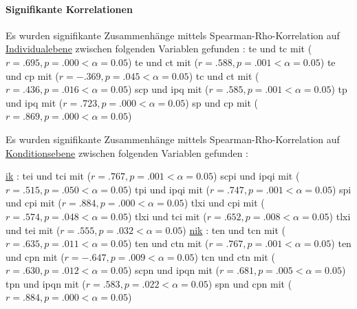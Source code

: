 \documentclass[a4paper,11pt]{article}%
\renewcommand{\\}{\vspace*{0.5\baselineskip} \newline}
\begin{document}
\paragraph{Signifikante Korrelationen}
Es wurden signifikante Zusammenhänge mittels Spearman-Rho-Korrelation auf \underline{Individualebene} zwischen folgenden Variablen gefunden :\newline
\acs{te} und \acs{tc} mit ($r = .695, p = .000 < \alpha = 0.05$)\newline
\acs{te} und \acs{ct} mit ($r = .588, p = .001 < \alpha = 0.05$)\newline
\acs{te} und \acs{cp} mit ($r = -.369, p = .045 < \alpha = 0.05$)\newline
\acs{tc} und \acs{ct} mit ($r = .436, p = .016 < \alpha = 0.05$)\newline
\acs{scp} und \acs{ipq} mit ($r = .585, p = .001 < \alpha = 0.05$)\newline
\acs{tp} und \acs{ipq} mit ($r = .723, p = .000 < \alpha = 0.05$)\newline
\acs{sp} und \acs{cp} mit ($r = .869, p = .000 < \alpha = 0.05$)\newline

Es wurden signifikante Zusammenhänge mittels Spearman-Rho-Korrelation auf \underline{Konditionsebene} zwischen folgenden Variablen gefunden :

\underline{\ac{ik}} :\newline
\acs{tei} und \ac{tci} mit ($r = .767, p = .001 < \alpha = 0.05$)\newline
\acs{scpi} und \acs{ipqi} mit ($r = .515, p = .050 < \alpha = 0.05$)\newline
\acs{tpi} und \acs{ipqi} mit ($r = .747, p = .001 < \alpha = 0.05$)\newline
\acs{spi} und \acs{cpi} mit ($r = .884, p = .000 < \alpha = 0.05$)\newline
\acs{tlxi} und \acs{cpi} mit ($r = .574, p = .048 < \alpha = 0.05$)\newline
\acs{tlxi} und \acs{tci} mit ($r = .652, p = .008 < \alpha = 0.05$)\newline
\acs{tlxi} und \acs{tei} mit ($r = .555, p = .032 < \alpha = 0.05$)\newline
\newline
\underline{\ac{nik}} :\newline
\acs{ten} und \acs{tcn} mit ($r = .635, p = .011 < \alpha = 0.05$)\newline
\acs{ten} und \acs{ctn} mit ($r = .767, p = .001 < \alpha = 0.05$)\newline
\acs{ten} und \acs{cpn} mit ($r = -.647, p = .009 < \alpha = 0.05$)\newline
\acs{tcn} und \acs{ctn} mit ($r = .630, p = .012 < \alpha = 0.05$)\newline
\acs{scpn} und \acs{ipqn} mit ($r = .681, p = .005 < \alpha = 0.05$)\newline
\acs{tpn} und \acs{ipqn} mit ($r = .583, p = .022 < \alpha = 0.05$)\newline
\acs{spn} und \acs{cpn} mit ($r = .884, p = .000 < \alpha = 0.05$)\newline
%
\end{document}
